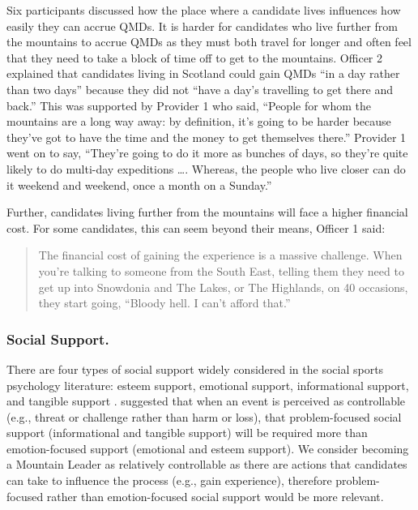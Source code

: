 \documentclass[
  12pt,
  a4paper,
]{book}
\begin{document}
Six participants discussed how the place where a candidate lives influences how easily they can accrue QMDs. It is harder for candidates who live further from the mountains to accrue QMDs as they must both travel for longer and often feel that they need to take a block of time off to get to the mountains. Officer 2 explained that candidates living in Scotland could gain QMDs ``in a day rather than two days'' because they did not ``have a day's travelling to get there and back.'' This was supported by Provider 1 who said, ``People for whom the mountains are a long way away: by definition, it's going to be harder because they've got to have the time and the money to get themselves there.'' Provider 1 went on to say, ``They're going to do it more as bunches of days, so they're quite likely to do multi-day expeditions \ldots. Whereas, the people who live closer can do it weekend and weekend, once a month on a Sunday.''

Further, candidates living further from the mountains will face a higher financial cost. For some candidates, this can seem beyond their means, Officer 1 said:

\begin{quote}
The financial cost of gaining the experience is a massive challenge. When you're talking to someone from the South East, telling them they need to get up into Snowdonia and The Lakes, or The Highlands, on 40 occasions, they start going, ``Bloody hell. I can't afford that.''
\end{quote}

\hypertarget{qual-gta-social-support}{%
\subsubsection{Social Support.}\label{qual-gta-social-support}}

There are four types of social support widely considered in the social sports psychology literature: esteem support, emotional support, informational support, and tangible support \citep{Cutrona1990a, Cutrona1990b, Freeman2010, Freeman2014, Rees2007a, Rees2007}. \citet{Cutrona1990a} suggested that when an event is perceived as controllable (e.g., threat or challenge rather than harm or loss), that problem-focused social support (informational and tangible support) will be required more than emotion-focused support (emotional and esteem support). We consider becoming a Mountain Leader as relatively controllable as there are actions that candidates can take to influence the process (e.g., gain experience), therefore problem-focused rather than emotion-focused social support would be more relevant.
\end{document}
